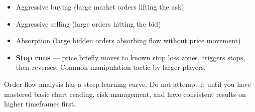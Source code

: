 \begin{itemize}
  \item Aggressive buying (large market orders lifting the ask)
  \item Aggressive selling (large orders hitting the bid)
  \item Absorption (large hidden orders absorbing flow without price movement)
  \item \textbf{Stop runs} — price briefly moves to known stop loss zones, triggers stops,
        then reverses. Common manipulation tactic by larger players.
\end{itemize}

\begin{warningbox}
Order flow analysis has a steep learning curve. Do not attempt it until you have mastered
basic chart reading, risk management, and have consistent results on higher timeframes first.
\end{warningbox}
